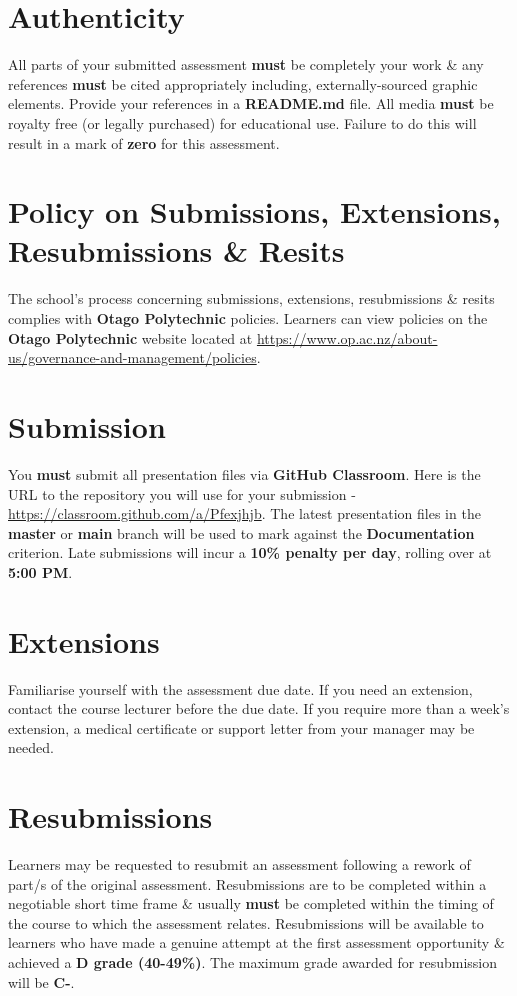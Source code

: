 \documentclass{article}
\begin{document}
\section*{Authenticity}
All parts of your submitted assessment \textbf{must} be completely your work \& any references \textbf{must} be cited appropriately including, externally-sourced graphic elements. Provide your references in a \textbf{README.md} file. All media \textbf{must} be royalty free (or legally purchased) for educational use. Failure to do this will result in a mark of \textbf{zero} for this assessment.

\section*{Policy on Submissions, Extensions, Resubmissions \& Resits}
The school's process concerning submissions, extensions, resubmissions \& resits complies with \textbf{Otago Polytechnic} policies. Learners can view policies on the \textbf{Otago Polytechnic} website located at \href{https://www.op.ac.nz/about-us/governance-and-management/policies}{https://www.op.ac.nz/about-us/governance-and-management/policies}.

\section*{Submission}
You \textbf{must} submit all presentation files via \textbf{GitHub Classroom}. Here is the URL to the repository you will use for your submission - \href{https://classroom.github.com/a/Pfexjhjb}{https://classroom.github.com/a/Pfexjhjb}. The latest presentation files in the \textbf{master} or \textbf{main} branch will be used to mark against the \textbf{Documentation} criterion. Late submissions will incur a \textbf{10\% penalty per day}, rolling over at \textbf{5:00 PM}.

\section*{Extensions}
Familiarise yourself with the assessment due date. If you need an extension, contact the course lecturer before the due date. If you require more than a week's extension, a medical certificate or support letter from your manager may be needed.

\section*{Resubmissions}
Learners may be requested to resubmit an assessment following a rework of part/s of the original assessment. Resubmissions are to be completed within a negotiable short time frame \& usually \textbf{must} be completed within the timing of the course to which the assessment relates. Resubmissions will be available to learners who have made a genuine attempt at the first assessment opportunity \& achieved a \textbf{D grade (40-49\%)}. The maximum grade awarded for resubmission will be \textbf{C-}.
\end{document}
